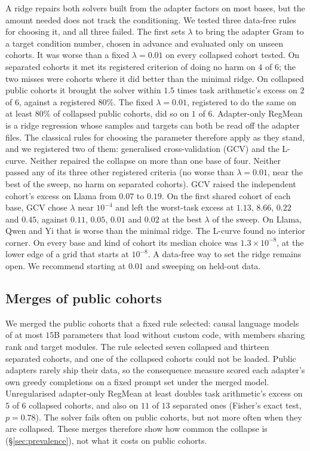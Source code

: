 A ridge repairs both solvers built from the adapter factors on most bases, but
the amount needed does not track the conditioning. We tested three data-free
rules for choosing it, and all three failed. The first sets $\lambda$ to bring
the adapter Gram to a target condition number, chosen in advance and evaluated
only on unseen cohorts. It was worse than a fixed $\lambda = 0.01$ on every
collapsed cohort tested. On separated cohorts it met its registered criterion
of doing no harm on $4$ of $6$; the two misses were cohorts where it did
better than the minimal ridge. On collapsed public cohorts it brought the
solver within $1.5$ times task arithmetic's excess on $2$ of $6$, against a
registered $80\%$. The fixed $\lambda = 0.01$, registered to do the same on at
least $80\%$ of collapsed public cohorts, did so on $1$ of $6$.
Adapter-only RegMean is a ridge regression whose samples and targets can both
be read off the adapter files. The classical rules for choosing the parameter
therefore apply as they stand, and we registered two of them: generalised
cross-validation (GCV) and the L-curve. Neither repaired the collapse on more
than one base of four. Neither passed any of its three other registered
criteria (no worse than $\lambda = 0.01$, near the best of the sweep, no harm
on separated cohorts). GCV raised the independent cohort's excess on Llama
from $0.07$ to $0.19$. On the first shared cohort of each base, GCV chose
$\lambda$ near $10^{-4}$ and left the worst-task excess at $1.13$, $8.66$,
$0.22$ and $0.45$, against $0.11$, $0.05$, $0.01$ and $0.02$ at the best
$\lambda$ of the sweep. On Llama, Qwen and Yi that is worse than the minimal
ridge. The L-curve found no interior corner. On every base and kind of cohort its median
choice was $1.3\times10^{-8}$, at the lower edge of a grid that starts at
$10^{-8}$. A data-free way to set the ridge remains open. We recommend
starting at $0.01$ and sweeping on held-out data.

\subsection{Merges of public cohorts}\label{subsec:against}

We merged the
public cohorts that a fixed rule selected: causal language models of at most
$15$B parameters that load without custom code, with members sharing rank and
target modules. The rule selected seven collapsed and thirteen separated
cohorts, and one of the collapsed cohorts could not be loaded. Public adapters
rarely ship their data, so the consequence measure scored each adapter's own
greedy completions on a fixed prompt set under the merged model.
Unregularised adapter-only RegMean at least doubles task arithmetic's excess
on $5$ of $6$ collapsed cohorts, and also on $11$ of $13$ separated ones
(Fisher's exact test, $p = 0.78$). The solver fails often on public cohorts,
but not more often when they are collapsed. These merges therefore show how
common the collapse is (\S\ref{sec:prevalence}), not what it costs on public
cohorts.

